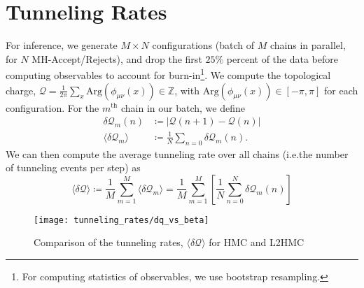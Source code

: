 %
\section{Tunneling Rates}%
\label{sec:tunneling_rates}
%
For inference, we generate \(M\times N\) configurations (batch of \(M\) chains in
parallel, for \(N\) MH-Accept/Rejects), and drop the first \(25\%\)
percent of the data before computing observables to account for
burn-in\footnote{For computing statistics of observables, we use bootstrap
resampling.}.
%
We compute the topological charge, \(\mathcal{Q} =
\frac{1}{2\pi}\sum_{x}\mathrm{Arg}\left(\phi_{\mu\nu}(x)\right) \in
\mathbb{Z}\), with \( \mathrm{Arg}\left(\phi_{\mu\nu}(x)\right) \in \left[-\pi,
\pi\right]\) for each configuration.
%
For the \(m^{\mathrm{th}}\) chain in our batch, we define 
%
\begin{align}
  \delta\mathcal{Q}_{m}(n) &\coloneqq |\mathcal{Q}{(n+1)} - \mathcal{Q}{(n)}|\\
  \langle\delta\mathcal{Q}_{m}\rangle &\coloneqq
  \frac{1}{N}\sum_{n=0}\delta\mathcal{Q}_{m}(n).
\end{align}
%
We can then compute the average tunneling rate over all chains (i.e.\@ the
number of tunneling events per step) as
%
\begin{equation}
  \langle \delta\mathcal{Q}\rangle%
  \coloneqq \frac{1}{M}\sum_{m=1}^{M}\langle\delta\mathcal{Q}_{m}\rangle
  =\frac{1}{M}\sum_{m=1}^{M}\left[\frac{1}{N}\sum_{n=0}^{N} \delta\mathcal{Q}_{m}(n)\right]
\end{equation}
%

\begin{figure}[htpb]
  \centering
  \texttt{[image: tunneling\_rates/dq\_vs\_beta]}
  \caption{Comparison of the tunneling rates,
  \(\langle\delta\mathcal{Q}\rangle\) for HMC and L2HMC}
\end{figure}

